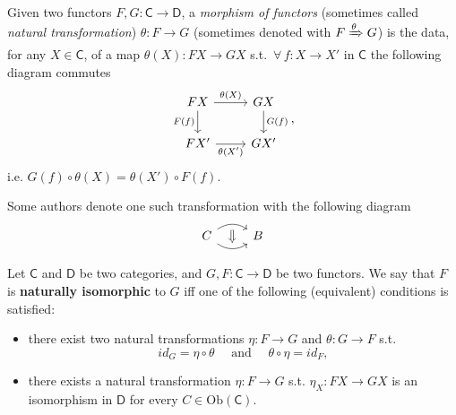 \begin{defn}
	Given two functors $F,G: \mathsf{C} \to \mathsf{D}$, a {\em morphism of functors} (sometimes called \textit{natural transformation}) $\theta: F \to G$ (sometimes denoted with $F \xRightarrow{\theta} G$) 
	is the data, for any $X \in \mathsf{C}$, of a map $\theta(X): FX \to GX$ s.t. $\,\forall\, f: X \to X'$ in $\mathsf{C}$ the following diagram commutes
	\begin{equation}
	\begin{tikzcd}
		FX \arrow[r, "{\theta(X)}", rightarrow] \arrow[d, "{F(f)}"', rightarrow] & GX \arrow[d, "{G(f)}", rightarrow] \\
		FX' \arrow[r, "{\theta(X')}"', rightarrow] & GX'
	\end{tikzcd}
	,\end{equation} 
	i.e. $G(f) \circ \theta(X) = \theta(X') \circ F(f)$.

	Some authors denote one such transformation with the following diagram
	\begin{equation}
	\begin{tikzcd}[row sep=tiny]
		C \arrow[r, ""{name=U, below}, rightarrow, bend left=35] 
		\arrow[r, ""{name=D}, rightarrow, bend right=35] &
		B
		\arrow[Rightarrow, from=U, to=D] 
	\end{tikzcd}
	\end{equation} 
\end{defn}

\begin{defn}
	Let $\mathsf{C}$ and $\mathsf{D}$ be two categories, and $G,F: \mathsf{C} \to \mathsf{D}$ be two functors.
	We say that $F$ is \textbf{naturally isomorphic} to $G$ iff one of the following (equivalent) conditions is satisfied:
	\begin{itemize}
		\item there exist two natural transformations $\eta: F \to G$ and $\theta: G \to F$ s.t.
			\begin{equation}
			id_G = \eta \circ \theta \quad \text{ and } \quad \theta \circ \eta = id_F
			,\end{equation} 
		\item there exists a natural transformation $\eta: F \to G$ s.t. $\eta_X: FX \to GX$ is an isomorphism in $\mathsf{D}$ for every $C \in \mathrm{Ob} \left(\mathsf{C}\right)$.
	\end{itemize}
\end{defn}

